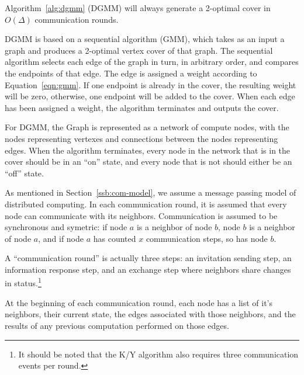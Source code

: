 \begin{thm}
  Algorithm~\ref{alg:dgmm} (DGMM) will always generate a 2-optimal cover in $O(\Delta)$ communication rounds.
\label{thm:dgmm-term}
\end{thm}
\begin{note}
\label{not:gmm-dgmm}
DGMM is based on a sequential algorithm (GMM), which takes as an input a graph and produces a 2-optimal vertex cover of that graph. The sequential algorithm selects each edge of the graph in turn, in arbitrary order, and compares the endpoints of that edge. The edge is assigned a weight according to Equation~\ref{eqn:gmm}. If one endpoint is already in the cover, the resulting weight will be zero, otherwise, one endpoint will be added to the cover. When each edge has been assigned a weight, the algorithm terminates and outputs the cover.

For DGMM, the Graph is represented as a network of compute nodes, with the nodes representing vertexes and connections between the nodes representing edges. When the algorithm terminates, every node in the network that is in the cover should be in an ``on'' state, and every node that is not should either be an ``off'' state.
\end{note}
\begin{note}
\label{not:com-model}
As mentioned in Section~\ref{ssb:com-model}, we assume a message passing model of distributed computing. In each communication round, it is assumed that every node can communicate with its neighbors. Communication is assumed to be synchronous and symetric: if node $a$ is a neighbor of node $b$, node $b$ is a neighbor of node $a$, and if node $a$ has counted $x$ communication steps, so has node $b$.

A ``communication round'' is actually three steps: an invitation sending step, an information response step, and an exchange step where neighbors share changes in status.\footnote{It should be noted that the K/Y algorithm also requires three communication events per round.} 
\end{note}
\begin{note}
\label{not:dgmm-local-info}
At the beginning of each communication round, each node has a list of it's neighbors, their current state, the edges associated with those neighbors, and the results of any previous computation performed on those edges.
\end{note}
